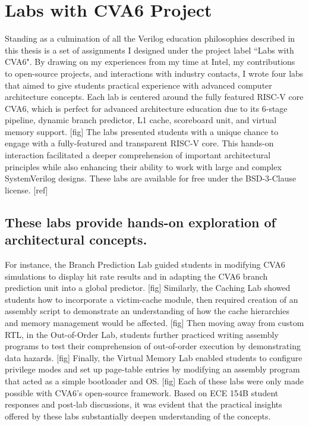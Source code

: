 
\chapter{Labs with CVA6 Project}
\label{chapter:labs_with_cva6}

Standing as a culmination of all the Verilog education philosophies described in this thesis is a set of assignments I designed under the project label ``Labs with CVA6". By drawing on my experiences from my time at Intel, my contributions to open-source projects, and interactions with industry contacts, I wrote four labs that aimed to give students practical experience with advanced computer architecture concepts. Each lab is centered around the fully featured RISC-V core CVA6, which is perfect for advanced architecture education due to its 6-stage pipeline, dynamic branch predictor, L1 cache, scoreboard unit, and virtual memory support. [fig] The labs presented students with a unique chance to engage with a fully-featured and transparent RISC-V core. This hands-on interaction facilitated a deeper comprehension of important architectural principles while also enhancing their ability to work with large and complex SystemVerilog designs. These labs are available for free under the BSD-3-Clause license. [ref]

\section{These labs provide hands-on exploration of architectural concepts.}

For instance, the Branch Prediction Lab guided students in modifying CVA6 simulations to display hit rate results and in adapting the CVA6 branch prediction unit into a global predictor. [fig] Similarly, the Caching Lab showed students how to incorporate a victim-cache module, then required creation of an assembly script to demonstrate an understanding of how the cache hierarchies and memory management would be affected. [fig] Then moving away from custom RTL, in the Out-of-Order Lab, students further practiced writing assembly programs to test their comprehension of out-of-order execution by demonstrating data hazards. [fig] Finally, the Virtual Memory Lab enabled students to configure privilege modes and set up page-table entries by modifying an assembly program that acted as a simple bootloader and OS. [fig] Each of these labs were only made possible with CVA6's open-source framework. Based on ECE 154B student responses and post-lab discussions, it was evident that the practical insights offered by these labs substantially deepen understanding of the concepts.

